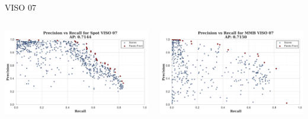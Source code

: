 \begin{frame}{VISO 07}
    \begin{columns}
        \begin{column}{0.5\textwidth}
            \centering
            \includegraphics[width=\textwidth,keepaspectratio]{images/bom/precision_recall_Spot_VISO_07.png}
        \end{column}
        \begin{column}{0.5\textwidth}
            \centering
            \includegraphics[width=\textwidth,keepaspectratio]{images/bom/precision_recall_MMB_VISO_07.png}
        \end{column}
    \end{columns}
\end{frame}

